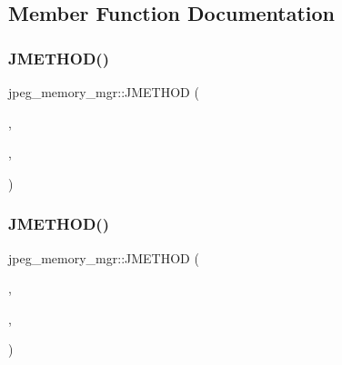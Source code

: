 \subsection{Member Function Documentation}
\mbox{\label{structjpeg__memory__mgr_a9372ad24444dda23175cc9203105911c}} 
\subsubsection{\texorpdfstring{JMETHOD()}{JMETHOD()}\hspace{0.1cm}{\footnotesize\ttfamily [1/11]}}
{\footnotesize\ttfamily jpeg\+\_\+memory\+\_\+mgr\+::\+J\+M\+E\+T\+H\+OD (\begin{DoxyParamCaption}\item[{void $\ast$}]{,  }\item[{\mbox{\hyperlink{jmemmgr_8c_a6e4421c67636e6f167ced68315f70c2b}{alloc\+\_\+small}}}]{,  }\item[{(\mbox{\hyperlink{jpeglib_8h_a1a177ab705cefea8f30ec31a48e62650}{j\+\_\+common\+\_\+ptr}} cinfo, int pool\+\_\+id, size\+\_\+t \mbox{\hyperlink{jmemsys_8h_a473c898cf03a1563dc17fdafd08ddc30}{sizeofobject}})}]{ }\end{DoxyParamCaption})}

\mbox{\label{structjpeg__memory__mgr_a130f6dbc700cc045bdbe35beff2cb326}} 
\subsubsection{\texorpdfstring{JMETHOD()}{JMETHOD()}\hspace{0.1cm}{\footnotesize\ttfamily [2/11]}}
{\footnotesize\ttfamily jpeg\+\_\+memory\+\_\+mgr\+::\+J\+M\+E\+T\+H\+OD (\begin{DoxyParamCaption}\item[{void \mbox{\hyperlink{jmorecfg_8h_aef060b3456fdcc093a7210a762d5f2ed}{F\+AR}} $\ast$}]{,  }\item[{\mbox{\hyperlink{jmemmgr_8c_af69578de2938175b723191af0bf5b128}{alloc\+\_\+large}}}]{,  }\item[{(\mbox{\hyperlink{jpeglib_8h_a1a177ab705cefea8f30ec31a48e62650}{j\+\_\+common\+\_\+ptr}} cinfo, int pool\+\_\+id, size\+\_\+t \mbox{\hyperlink{jmemsys_8h_a473c898cf03a1563dc17fdafd08ddc30}{sizeofobject}})}]{ }\end{DoxyParamCaption})}

